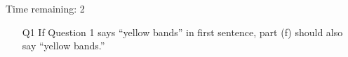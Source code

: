 \begin{frame}[t]
    \begin{center}
        \vspace{0.5cm}
        {\Huge Time remaining: 2}
    \end{center}

        \vspace{0.5cm}
        \begin{enumerate}
            \item[Q1] If Question 1 says ``yellow bands'' in first sentence,
                part (f) should also say ``yellow bands.''
        \end{enumerate}
\end{frame}




